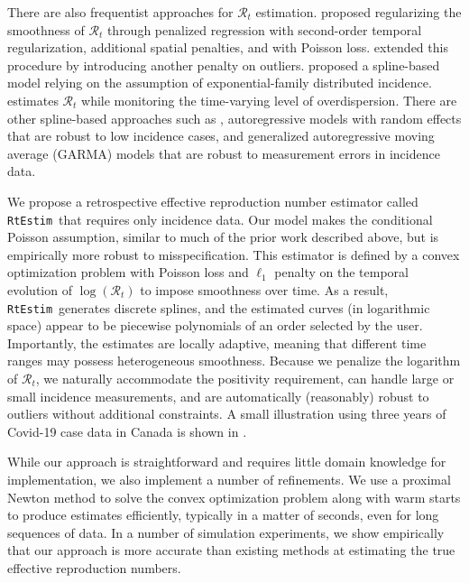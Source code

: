 \documentclass[10pt,letterpaper]{article}
\def\RtEstim{\texttt{RtEstim}}
\def\calR{\mathcal{R}}
\newcommand{\citep}[1]{\cite{#1}}
\begin{document}
There are also frequentist approaches for $\calR_t$ estimation.
\cite{abry2020spatial} proposed regularizing the smoothness of $\calR_t$
through penalized
regression with second-order temporal regularization, additional spatial
penalties, and with Poisson loss. \cite{pascal2022nonsmooth}
extended this procedure by introducing another penalty on outliers.
\cite{pircalabelu2023spline} proposed a spline-based model relying on the 
assumption of exponential-family distributed incidence. 
\cite{ho2023accounting} estimates $\calR_t$ while monitoring the time-varying
level of overdispersion. 
There are other spline-based approaches such as
\cite{azmon2014estimation,gressani2021approximate},
autoregressive models with random effects \citep{jin2023epimix} that are robust
to low incidence cases, and generalized autoregressive moving average (GARMA)
models \citep{hettinger2023estimating} that are robust to measurement errors in
incidence data. 


We propose a retrospective effective reproduction number estimator
called \RtEstim\ that requires only incidence data. Our model makes the
conditional Poisson assumption, similar to much of the prior work described
above, but is empirically more robust to misspecification. This estimator is 
defined by a convex optimization problem with Poisson loss and $\ell_1$ penalty 
on the temporal evolution of $\log(\calR_t)$ to impose smoothness over time. 
As a result, \RtEstim\ generates discrete splines, and the estimated curves (in
logarithmic space) appear to be piecewise polynomials of an order selected by the
user. Importantly, the estimates are locally adaptive, meaning that different
time ranges may possess heterogeneous smoothness. Because we penalize the
logarithm of $\calR_t$, we naturally accommodate the positivity requirement, can
handle large or small incidence measurements, and are automatically (reasonably)
robust to outliers without additional constraints. A small illustration using
three years of Covid-19 case data in Canada is shown in .


While our approach is straightforward and requires little domain knowledge for
implementation, we also implement a number of refinements. 
We use a proximal Newton method to solve the convex optimization problem along
with warm starts to produce estimates efficiently, typically in a matter of 
seconds, even for long sequences of data. In a number of simulation experiments, 
we show empirically that our approach is more accurate than existing methods at 
estimating the true effective reproduction numbers. 
\end{document}
